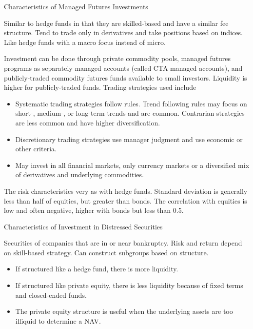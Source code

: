 \documentclass[../custom,grid]{flashcards}
\begin{document}
\begin{flashcard}{Characteristics of Managed Futures Investments}
    \begin{flushleft}
        Similar to hedge funds in that they are skilled-based and have a similar fee structure. Tend to trade only in derivatives and take positions based on indices. Like hedge funds with a macro focus instead of micro.\newline

        Investment can be done through private commodity pools, managed futures programs as separately managed accounts (called CTA managed accounts), and publicly-traded commodity futures funds available to small investors. Liquidity is higher for publicly-traded funds. Trading strategies used include
        \begin{itemize}
            \item Systematic trading strategies follow rules. Trend following rules may focus on short-, medium-, or long-term trends and are common. Contrarian strategies are less common and have higher diversification.
            \item Discretionary trading strategies use manager judgment and use economic or other criteria.
            \item May invest in all financial markets, only currency markets or a diversified mix of derivatives and underlying commodities.
        \end{itemize}
        The risk characteristics very as with hedge funds. Standard deviation is generally less than half of equities, but greater than bonds. The correlation with equities is low and often negative, higher with bonds but less than 0.5.
    \end{flushleft}
\end{flashcard}

\begin{flashcard}{Characteristics of Investment in Distressed Securities}
    \begin{flushleft}
        Securities of companies that are in or near bankruptcy. Risk and return depend on skill-based strategy. Can construct subgroups based on structure.
        \begin{itemize}
            \item If structured like a hedge fund, there is more liquidity.
            \item If structured like private equity, there is less liquidity because of fixed terms and closed-ended funds.
            \item The private equity structure is useful when the underlying assets are too illiquid to determine a NAV.
        \end{itemize}
    \end{flushleft}
\end{flashcard}
\end{document}

